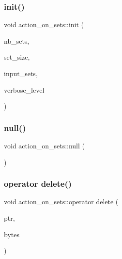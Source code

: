 \subsubsection{\texorpdfstring{init()}{init()}}
{\footnotesize\ttfamily void action\+\_\+on\+\_\+sets\+::init (\begin{DoxyParamCaption}\item[{\mbox{\hyperlink{galois_8h_a09fddde158a3a20bd2dcadb609de11dc}{I\+NT}}}]{nb\+\_\+sets,  }\item[{\mbox{\hyperlink{galois_8h_a09fddde158a3a20bd2dcadb609de11dc}{I\+NT}}}]{set\+\_\+size,  }\item[{\mbox{\hyperlink{galois_8h_a09fddde158a3a20bd2dcadb609de11dc}{I\+NT}} $\ast$}]{input\+\_\+sets,  }\item[{\mbox{\hyperlink{galois_8h_a09fddde158a3a20bd2dcadb609de11dc}{I\+NT}}}]{verbose\+\_\+level }\end{DoxyParamCaption})}

\mbox{\label{classaction__on__sets_a6569141597e96749c1b58c4c3798e9df}} 
\subsubsection{\texorpdfstring{null()}{null()}}
{\footnotesize\ttfamily void action\+\_\+on\+\_\+sets\+::null (\begin{DoxyParamCaption}{ }\end{DoxyParamCaption})}

\mbox{\label{classaction__on__sets_a0201fc0ab8b7968f3839e7a989119b2b}} 
\subsubsection{\texorpdfstring{operator delete()}{operator delete()}}
{\footnotesize\ttfamily void action\+\_\+on\+\_\+sets\+::operator delete (\begin{DoxyParamCaption}\item[{void $\ast$}]{ptr,  }\item[{size\+\_\+t}]{bytes }\end{DoxyParamCaption})}

